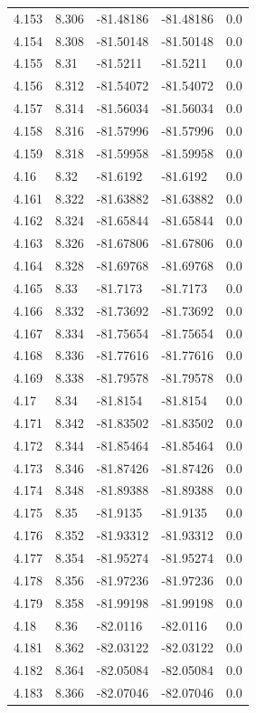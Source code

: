 \begin{tabular}{lllll}
4.153 & 8.306 & -81.48186 & -81.48186 & 0.0 \\
4.154 & 8.308 & -81.50148 & -81.50148 & 0.0 \\
4.155 & 8.31 & -81.5211 & -81.5211 & 0.0 \\
4.156 & 8.312 & -81.54072 & -81.54072 & 0.0 \\
4.157 & 8.314 & -81.56034 & -81.56034 & 0.0 \\
4.158 & 8.316 & -81.57996 & -81.57996 & 0.0 \\
4.159 & 8.318 & -81.59958 & -81.59958 & 0.0 \\
4.16 & 8.32 & -81.6192 & -81.6192 & 0.0 \\
4.161 & 8.322 & -81.63882 & -81.63882 & 0.0 \\
4.162 & 8.324 & -81.65844 & -81.65844 & 0.0 \\
4.163 & 8.326 & -81.67806 & -81.67806 & 0.0 \\
4.164 & 8.328 & -81.69768 & -81.69768 & 0.0 \\
4.165 & 8.33 & -81.7173 & -81.7173 & 0.0 \\
4.166 & 8.332 & -81.73692 & -81.73692 & 0.0 \\
4.167 & 8.334 & -81.75654 & -81.75654 & 0.0 \\
4.168 & 8.336 & -81.77616 & -81.77616 & 0.0 \\
4.169 & 8.338 & -81.79578 & -81.79578 & 0.0 \\
4.17 & 8.34 & -81.8154 & -81.8154 & 0.0 \\
4.171 & 8.342 & -81.83502 & -81.83502 & 0.0 \\
4.172 & 8.344 & -81.85464 & -81.85464 & 0.0 \\
4.173 & 8.346 & -81.87426 & -81.87426 & 0.0 \\
4.174 & 8.348 & -81.89388 & -81.89388 & 0.0 \\
4.175 & 8.35 & -81.9135 & -81.9135 & 0.0 \\
4.176 & 8.352 & -81.93312 & -81.93312 & 0.0 \\
4.177 & 8.354 & -81.95274 & -81.95274 & 0.0 \\
4.178 & 8.356 & -81.97236 & -81.97236 & 0.0 \\
4.179 & 8.358 & -81.99198 & -81.99198 & 0.0 \\
4.18 & 8.36 & -82.0116 & -82.0116 & 0.0 \\
4.181 & 8.362 & -82.03122 & -82.03122 & 0.0 \\
4.182 & 8.364 & -82.05084 & -82.05084 & 0.0 \\
4.183 & 8.366 & -82.07046 & -82.07046 & 0.0 \\

\end{tabular}
